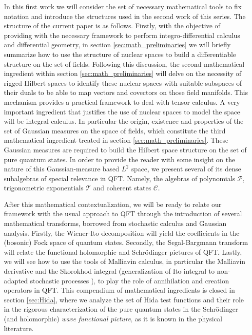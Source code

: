 \documentclass{elsarticle}%
\begin{document}
  In this first work we will consider the set of necessary mathematical tools to fix notation and  introduce the structures used in the second work of this series. The structure of the current paper is as follows. Firstly, with the objective of providing with the necessary framework to perform integro-differential calculus and differential geometry, in  section \ref{sec:math_preliminaries} we will briefly summarize how to use the structure of nuclear spaces  to build a differentiable structure on the set of fields. Following this discussion, the second mathematical ingredient within section \ref{sec:math_preliminaries} will delve on the necessity of rigged Hilbert spaces to identify these nuclear spaces with suitable subspaces of their duals to be able to map vectors and covectors on those field manifolds. This mechanism provides a practical framework to deal with tensor calculus.  A very important ingredient  that justifies the use of nuclear spaces to model the space will be  integral calculus. In particular the origin, existence and properties of the set of Gaussian measures on the space of fields, which constitute the third mathematical ingredient treated in section \ref{sec:math_preliminaries}. These Gaussian measures are required to build the Hilbert space structure on the set of pure quantum states.  In order to provide the reader with some insight on the nature of this Gaussian-measure based $L^2$ space, we present several of its dense subalgebras of special relevance in QFT. Namely, the algebras of polynomials $\mathcal{P}$, trigonometric exponentials $\mathcal{T}$ and coherent states $\mathcal{C}$.   
 
  After this mathematical contextualization, we will be ready  to relate our framework with the usual approach to QFT through the introduction of several mathematical transforms, borrowed from stochastic calculus and Gaussian analysis. Firstly, the Wiener-Ito decomposition will yield the coefficients in the (bosonic) Fock space of quantum states. Secondly, the Segal-Bargmann transform will relate the  functional holomorphic and Schrödinger  pictures of QFT. Lastly,  we will  see how to use the tools of Malliavin calculus, in particular the  Malliavin derivative and the Skorokhod integral (generalization of Ito integral to non-adapted stochastic processes \cite{nunnoMalliavinCalculus2009}), to play the  role of  annihilation and creation operators in QFT.
 This compendium of mathematical ingredients   is closed in section \ref{sec:Hida}, where we analyze the set of Hida test functions and their role in the rigorous characterization of the pure quantum states in the Schrödinger (and holomorphic) \textit{wave functional picture},  as it is known in the physical literature.
\end{document}

